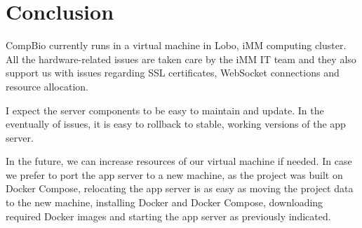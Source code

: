 \section{Conclusion}

CompBio currently runs in a virtual machine in Lobo, iMM computing cluster. All the hardware-related issues are taken care by the iMM IT team and they also support us with issues regarding SSL certificates, WebSocket connections and resource allocation.

I expect the server components to be easy to maintain and update. In the eventually of issues, it is easy to rollback to stable, working versions of the app server.

In the future, we can increase resources of our virtual machine if needed. In case we prefer to port the app server to a new machine, as the project was built on Docker Compose, relocating the app server is as easy as moving the project data to the new machine, installing Docker and Docker Compose, downloading required Docker images and starting the app server as previously indicated.
